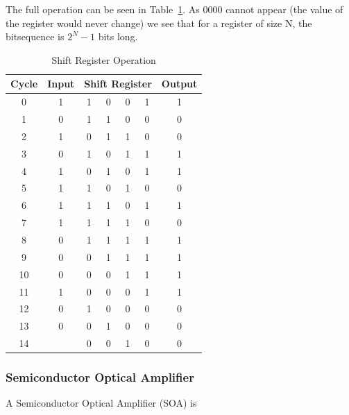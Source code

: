 The full operation can be seen in Table~\ref{tab:shift_reg}. As 0000 cannot
appear (the value of the register would never change) we see that for a register of size N, the
bitsequence is $2^N - 1$ bits long. 
\begin{table}[ht]
    \centering
    \begin{tabular}{|c|c|c c c c|c|}
    \hline
    Cycle & Input & \multicolumn{4}{|c|}{Shift Register} & Output \\
    \hline
     0  & 1 & 1 & 0 & 0 & 1 & 1 \\
     1  & 0 & 1 & 1 & 0 & 0 & 0 \\
     2  & 1 & 0 & 1 & 1 & 0 & 0 \\
     3  & 0 & 1 & 0 & 1 & 1 & 1 \\
     4  & 1 & 0 & 1 & 0 & 1 & 1 \\
     5  & 1 & 1 & 0 & 1 & 0 & 0 \\
     6  & 1 & 1 & 1 & 0 & 1 & 1 \\
     7  & 1 & 1 & 1 & 1 & 0 & 0 \\
     8  & 0 & 1 & 1 & 1 & 1 & 1 \\
     9  & 0 & 0 & 1 & 1 & 1 & 1 \\
     10 & 0 & 0 & 0 & 1 & 1 & 1 \\
     11 & 1 & 0 & 0 & 0 & 1 & 1 \\
     12 & 0 & 1 & 0 & 0 & 0 & 0 \\
     13 & 0 & 0 & 1 & 0 & 0 & 0 \\
     14 &   & 0 & 0 & 1 & 0 & 0 \\
    \hline
    \end{tabular}
    \caption{Shift Register Operation}
    \label{tab:shift_reg}
\end{table}

\subsubsection{Semiconductor Optical Amplifier}%
\label{ssub:semiconductor_optical_amplifier}
A Semiconductor Optical Amplifier (SOA) is 




